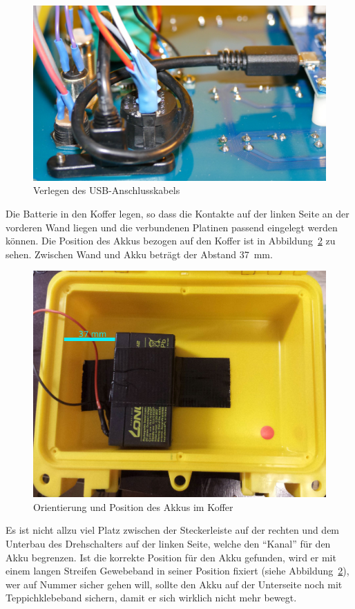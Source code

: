 \documentclass[paper=a4, open=any, numbers=noenddot]{scrbook}
\begin{document}
			\begin{figure}
				\begin{center}
					\includegraphics[width=.8\textwidth]{Bilder/usb-knoten}
				\end{center}
				\caption{Verlegen des USB-Anschlusskabels}
				\label{fig:usbknoten}
			\end{figure}

			Die Batterie in den Koffer legen, so dass die Kontakte auf der linken Seite an der vorderen Wand liegen und die verbundenen Platinen passend eingelegt werden können. Die Position des Akkus bezogen auf den Koffer ist in Abbildung~\ref{fig:akkuposition} zu sehen. Zwischen Wand und Akku beträgt der Abstand \SI{37}{\milli\metre}.

			\begin{figure}
				\centering\includegraphics[width=.8\textwidth]{Bilder/Akkuposition}
				\caption{Orientierung und Position des Akkus im Koffer}
				\label{fig:akkuposition}
			\end{figure}

			Es ist nicht allzu viel Platz zwischen der Steckerleiste auf der rechten und dem Unterbau des Drehschalters auf der linken Seite, welche den \enquote{Kanal} für den Akku begrenzen. Ist die korrekte Position für den Akku gefunden, wird er mit einem langen Streifen Gewebeband in seiner Position fixiert (siehe Abbildung~\ref{fig:akkuposition}), wer auf Nummer sicher gehen will, sollte den Akku auf der Unterseite noch mit Teppichklebeband sichern, damit er sich wirklich nicht mehr bewegt.
\end{document}
